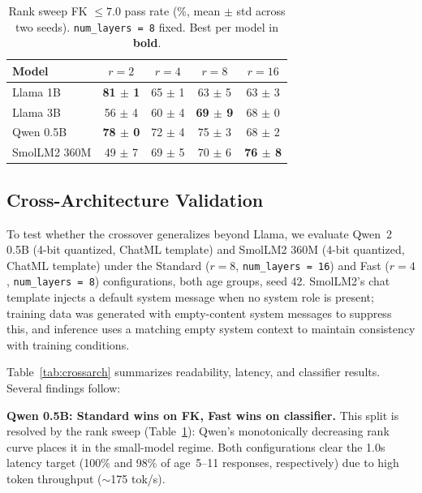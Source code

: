 \documentclass[ASNA,twocolumn]{USG} %
\begin{document}
\begin{table}[!t]
  \centering
  \caption{Rank sweep FK $\leq 7.0$ pass rate (\%, mean $\pm$ std across two seeds). \texttt{num\_layers~=~8} fixed. Best per model in \textbf{bold}.}
  \label{tab:ranksweep}
  \small
  \begin{tabular}{lcccc}
    \hline
    Model        & $r=2$               & $r=4$     & $r=8$               & $r=16$ \\
    \hline
    Llama 1B     & \textbf{81 $\pm$ 1} & 65 $\pm$ 1 & 63 $\pm$ 5         & 63 $\pm$ 3 \\
    Llama 3B     & 56 $\pm$ 4          & 60 $\pm$ 4 & \textbf{69 $\pm$ 9} & 68 $\pm$ 0 \\
    Qwen 0.5B    & \textbf{78 $\pm$ 0} & 72 $\pm$ 4 & 75 $\pm$ 3         & 68 $\pm$ 2 \\
    SmolLM2 360M & 49 $\pm$ 7          & 69 $\pm$ 5 & 70 $\pm$ 6         & \textbf{76 $\pm$ 8} \\
    \hline
  \end{tabular}
\end{table}

\subsection{Cross-Architecture Validation}\label{sec:crossarch}

To test whether the crossover generalizes beyond Llama, we evaluate Qwen~2 0.5B (4-bit quantized, ChatML template) and SmolLM2 360M \cite{allal2025smollm2} (4-bit quantized, ChatML template) under the Standard ($r=8$, \texttt{num\_layers~=~16}) and Fast ($r=4$, \texttt{num\_layers~=~8}) configurations, both age groups, seed 42. SmolLM2's chat template injects a default system message when no system role is present; training data was generated with empty-content system messages to suppress this, and inference uses a matching empty system context to maintain consistency with training conditions.

Table~\ref{tab:crossarch} summarizes readability, latency, and classifier results. Several findings follow:

\textbf{Qwen 0.5B: Standard wins on FK, Fast wins on classifier.} This split is resolved by the rank sweep (Table~\ref{tab:ranksweep}): Qwen's monotonically decreasing rank curve places it in the small-model regime. Both configurations clear the 1.0s latency target (100\% and 98\% of age~5--11 responses, respectively) due to high token throughput ($\sim$175 tok/s).
\end{document}
